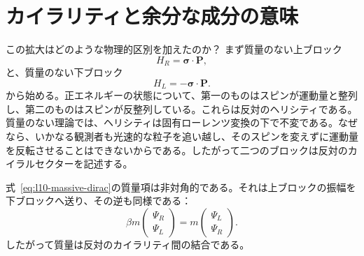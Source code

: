 \section{カイラリティと余分な成分の意味}

この拡大はどのような物理的区別を加えたのか？ まず質量のない上ブロック
\begin{equation}
H_R=\boldsymbol{\sigma}\cdot\mathbf P,
\end{equation}
と、質量のない下ブロック
\begin{equation}
H_L=-\boldsymbol{\sigma}\cdot\mathbf P.
\end{equation}
から始める。正エネルギーの状態について、第一のものはスピンが運動量と整列し、第二のものはスピンが反整列している。これらは反対のヘリシティである。質量のない理論では、ヘリシティは固有ローレンツ変換の下で不変である。なぜなら、いかなる観測者も光速的な粒子を追い越し、そのスピンを変えずに運動量を反転させることはできないからである。したがって二つのブロックは反対のカイラルセクターを記述する。

\begin{classroomqa}
\end{classroomqa}

式~\eqref{eq:l10-massive-dirac}の質量項は非対角的である。それは上ブロックの振幅を下ブロックへ送り、その逆も同様である：
\begin{equation}
\beta m
\begin{pmatrix}
\Psi_R\\
\Psi_L
\end{pmatrix}
=
m
\begin{pmatrix}
\Psi_L\\
\Psi_R
\end{pmatrix}.
\end{equation}
したがって質量は反対のカイラリティ間の結合である。

\begin{classroomqa}
\end{classroomqa}

